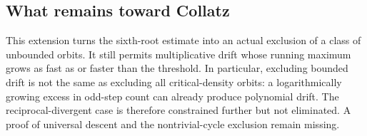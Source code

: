 \documentclass[11pt]{article}
\begin{document}
\subsection*{What remains toward Collatz}
This extension turns the sixth-root estimate into an actual exclusion of a class of unbounded orbits. It still permits multiplicative drift whose running maximum grows as fast as or faster than the threshold. In particular, excluding bounded drift is not the same as excluding all critical-density orbits: a logarithmically growing excess in odd-step count can already produce polynomial drift. The reciprocal-divergent case is therefore constrained further but not eliminated. A proof of universal descent and the nontrivial-cycle exclusion remain missing.
\end{document}
